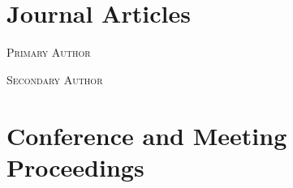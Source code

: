 \documentclass[letterpaper,12pt]{article}
\begin{document}
\newpage
\section{Journal Articles}
\vspace{0.05in}
\begin{center}
\textsc{Primary Author}
\end{center}
\begin{refsection}
\nocite{*}
\printbibliography[heading=none]
\end{refsection}

\vspace{0.05in}
\begin{center}
\textsc{Secondary Author}
\end{center}
\begin{refsection}
\nocite{*}
\printbibliography[heading=none]
\end{refsection}

\section{Conference and Meeting Proceedings}
\begin{refsection}
\nocite{*}
\printbibliography[heading=none]
\end{refsection}

\vfill
{}
\end{document}
